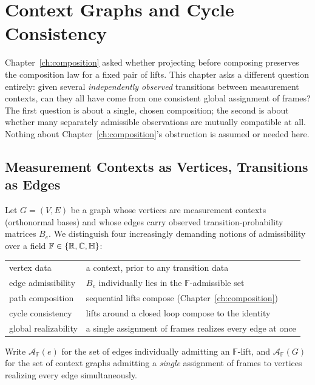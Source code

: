 \chapter{Context Graphs and Cycle Consistency}
\label{ch:context-graphs}

Chapter~\ref{ch:composition} asked whether projecting before composing
preserves the composition law for a fixed pair of lifts. This chapter asks a
different question entirely: given several \emph{independently observed}
transitions between measurement contexts, can they all have come from one
consistent global assignment of frames? The first question is about a
single, chosen composition; the second is about whether many separately
admissible observations are mutually compatible at all. Nothing about
Chapter~\ref{ch:composition}'s obstruction is assumed or needed here.

\section{Measurement Contexts as Vertices, Transitions as Edges}

Let $G = (V, E)$ be a graph whose vertices are measurement contexts (orthonormal
bases) and whose edges carry observed transition-probability matrices $B_e$. We
distinguish four increasingly demanding notions of admissibility over a field
$\mathbb F \in \{\mathbb{R}, \mathbb{C}, \mathbb{H}\}$:
\begin{center}
\begin{tabular}{@{}ll@{}}
\toprule
vertex data & a context, prior to any transition data \\
edge admissibility & $B_e$ individually lies in the $\mathbb F$-admissible set \\
path composition & sequential lifts compose (Chapter~\ref{ch:composition}) \\
cycle consistency & lifts around a closed loop compose to the identity \\
global realizability & a single assignment of frames realizes every edge at once \\
\bottomrule
\end{tabular}
\end{center}

\begin{definition}
Write $\mathcal A_{\mathbb F}(e)$ for the set of edges individually admitting an
$\mathbb F$-lift, and $\mathcal A_{\mathbb F}(G)$ for the set of context graphs
admitting a \emph{single} assignment of frames to vertices realizing every edge
simultaneously.
\end{definition}

